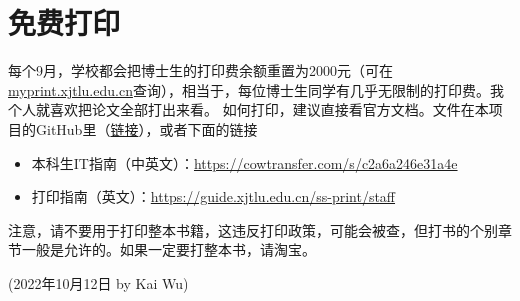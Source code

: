 \section{免费打印}
每个9月，学校都会把博士生的打印费余额重置为2000元（可在\url{myprint.xjtlu.edu.cn}查询），相当于，每位博士生同学有几乎无限制的打印费。我个人就喜欢把论文全部打出来看。
如何打印，建议直接看官方文档。文件在本项目的GitHub里（\href{https://github.com/kaiwu-astro/xp_pgrs_unofficial_guide/tree/main/fileshare}{链接}），或者下面的链接
\begin{itemize}
    \item 本科生IT指南（中英文）：\url{https://cowtransfer.com/s/c2a6a246e31a4e}
    \item 打印指南（英文）：\url{https://guide.xjtlu.edu.cn/ss-print/staff}
\end{itemize}

注意，请不要用于打印整本书籍，这违反打印政策，可能会被查，但打书的个别章节一般是允许的。如果一定要打整本书，请淘宝。


\begin{flushright}
(2022年10月12日 by Kai Wu)
\end{flushright}